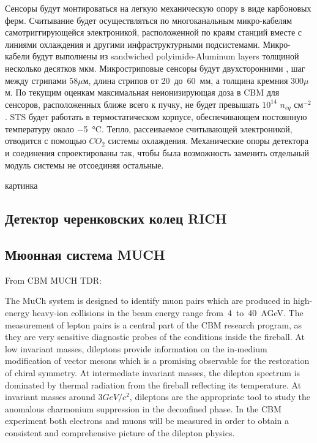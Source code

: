 Сенсоры будут монтироваться на легкую механическую опору в виде карбоновых ферм. Считывание будет осуществляться по многоканальным микро-кабелям самотриггирующейся электроникой, расположенной по краям станций вместе с линиями охлаждения и другими инфраструктурными подсистемами. Микро-кабели будут выполнены из sandwiched polyimide-Aluminum layers толщиной несколько десятков мкм.
Микростриповые сенсоры будут двухсторонними \todo, шаг между стрипами $58 \mu$м, длина стрипов от 20~до~60~мм, а толщина кремния $300 \mu$м. По текущим оценкам максимальная неионизирующая доза в CBM для сенсоров, расположенных ближе всего к пучку, не будет превышать $10^{14}$ $n_{eq}$ см$^{-2}$. STS будет работать в термостатическом корпусе, обеспечивающем постоянную температуру около \SI{-5}{\degreeCelsius}. Тепло, рассеиваемое считывающей электроникой, отводится с помощью $CO_{2}$ системы охлаждения. Механические опоры детектора и соединения спроектированы так, чтобы была возможность заменить отдельный модуль системы не отсоединяя остальные.

\todo картинка

\subsection{Детектор черенковских колец RICH}\label{sec:secRICH}

\subsection{Мюонная система MUCH}\label{sec:secMUCH}

From CBM MUCH TDR:

The MuCh system is designed to identify muon pairs which are produced in high-energy heavy-ion collisions in the beam energy range from~4~to~40~AGeV. The measurement of lepton pairs is a central part of the CBM research program, as they are very sensitive diagnostic probes of the conditions inside the fireball. At low invariant masses, dileptons provide information on the in-medium modification of vector mesons which is a promising observable for the restoration of chiral symmetry. At intermediate invariant masses, the dilepton spectrum is dominated by thermal radiation from the fireball reflecting its temperature. At invariant masses around $ 3 GeV/c^{2} $, dileptons are the appropriate tool to study the anomalous charmonium suppression in the deconfined phase. In the CBM experiment both electrons and muons will be measured in order to obtain a consistent and comprehensive picture of the dilepton physics.


